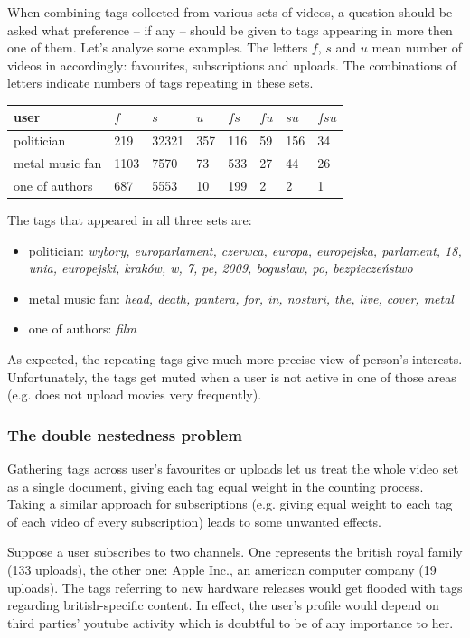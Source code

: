 \documentclass{article}
\begin{document}
When combining tags collected from various sets of videos, a question should be
asked what preference -- if any -- should be given to tags appearing in more
then one of them. Let's analyze some examples. The letters $f$, $s$ and $u$ mean number
of videos in accordingly: favourites, subscriptions and uploads. The
combinations of letters indicate numbers of tags repeating in these sets.

\begin{tabular}{| l | l | l | l | l | l | l | l |}
user & $f$ & $s$ & $u$ & $fs$ & $fu$ & $su$ & $fsu$ \\ \hline
politician & 219 & 32321 & 357 & 116 & 59 & 156 & 34 \\
metal music fan & 1103 & 7570 & 73 & 533 & 27 & 44 & 26 \\
one of authors & 687 & 5553 & 10 & 199 & 2 & 2 & 1 \\
\end{tabular}

The tags that appeared in all three sets are:
\begin{itemize}
  \item{politician: \emph{wybory, europarlament, czerwca, europa, europejska,
  parlament, 18, unia, europejski, kraków, w, 7, pe, 2009, bogusław, po,
  bezpieczeństwo}}
  \item{metal music fan: \emph{head, death, pantera, for, in, nosturi, the, live, cover, metal}}
  \item{one of authors: \emph{film}}
\end{itemize}

As expected, the repeating tags give much more precise view of person's
interests. Unfortunately, the tags get muted when a user is not active in one of
those areas (e.g. does not upload movies very frequently).

\subsubsection{The double nestedness problem}
Gathering tags across user's favourites or uploads let us treat the whole video
set as a single document, giving each tag equal weight in the counting process.
Taking a similar approach for subscriptions (e.g. giving equal weight to each
tag of each video of every subscription) leads to some unwanted effects.

Suppose a user subscribes to two channels. One represents the british royal
family (133 uploads), the other one: Apple Inc., an american computer company
(19 uploads). The tags referring to new hardware releases would get flooded with
tags regarding british-specific content. In effect, the user's profile would
depend on third parties' youtube activity which is doubtful to be of any
importance to her.
\end{document}
